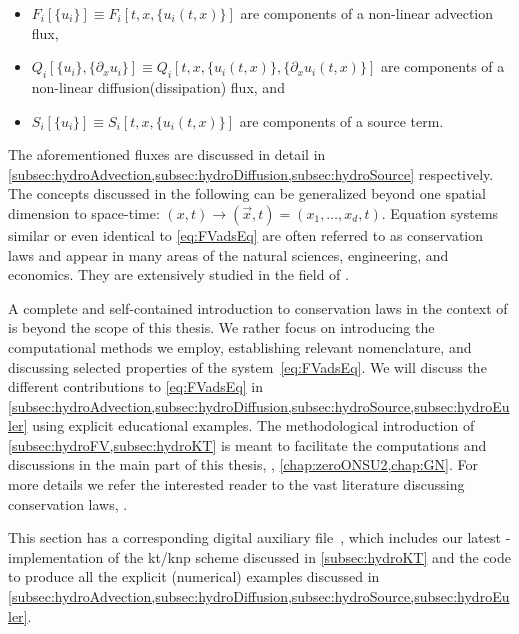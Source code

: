 \begin{itemize}
	\item $F_i [ \{u_i\} ] \equiv F_i [ t, x, \{u_i ( t, x )\} ]$ are components of a non-linear advection flux, 
	\item $ Q_i [ \{u_i\} , \{\partial_x u_i\} ] \equiv Q_i [ t, x, \{u_i ( t, x)\} , \{\partial_x u_i ( t, x )\} ]$ are components of a non-linear diffusion(dissipation) flux, and 
	\item $S_i [ \{u_i\} ] \equiv S_i [ t, x, \{u_i ( t, x)\} ]$ are components of a source term.
\end{itemize}
The aforementioned fluxes are discussed in detail in \cref{subsec:hydroAdvection,subsec:hydroDiffusion,subsec:hydroSource} respectively.
The concepts discussed in the following can be generalized beyond one spatial dimension to  space-time: $( x, t ) \rightarrow ( \vec{x}, t ) = ( x_1, \ldots, x_d, t )$.
Equation systems similar or even identical to \cref{eq:FVadsEq} are often referred to as conservation laws and appear in many areas of the natural sciences, engineering, and economics.
They are extensively studied in the field of .

A complete and self-contained introduction to conservation laws in the context of \cfd{} is beyond the scope of this thesis.
We rather focus on introducing the computational methods we employ, establishing relevant nomenclature, and discussing selected properties of the system~\eqref{eq:FVadsEq}.
We will discuss the different contributions to \cref{eq:FVadsEq} in \cref{subsec:hydroAdvection,subsec:hydroDiffusion,subsec:hydroSource,subsec:hydroEuler} using explicit educational examples.
The methodological introduction of \cref{subsec:hydroFV,subsec:hydroKT} is meant to facilitate the computations and discussions in the main part of this thesis, \ie{}, \cref{chap:zeroONSU2,chap:GN}.
For more details we refer the interested reader to the vast literature discussing conservation laws, \cf{} .

This section has a corresponding digital auxiliary file~\cite{Steil:2023PhDFVNB}, which includes our latest \WAM{}-implementation of the \acrshort{kt}/\acrshort{knp} scheme discussed in \cref{subsec:hydroKT} and the code to produce all the explicit (numerical) examples discussed in \cref{subsec:hydroAdvection,subsec:hydroDiffusion,subsec:hydroSource,subsec:hydroEuler}.

